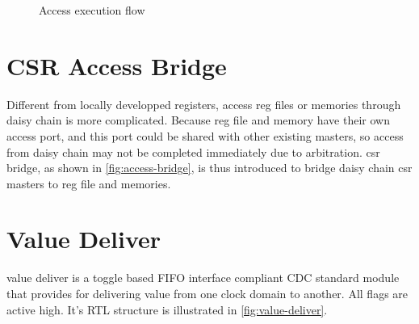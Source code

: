 \documentclass[10pt,oneside]{book}
\begin{document}
\SetAlFnt{\small}
\SetAlCapFnt{\small}
\SetAlCapNameFnt{\small}
\begin{figure}[hbtp]
  \begin{algorithm}[H]
    \caption{Access execution flow}\label{alg:access}
  \end{algorithm}
\end{figure}




\section{CSR Access Bridge}
Different from locally developped registers, access \gls{reg file}s or memories
through daisy chain is more complicated. Because \gls{reg file} and memory have
their own access port, and this port could be shared with other existing masters, 
so access from daisy chain may not be completed immediately due to arbitration. 
\gls{csr bridge}, as shown in \autoref{fig:access-bridge},
is thus introduced to bridge daisy chain \gls{csr master}s to \gls{reg file} 
and memories. 



\section{Value Deliver}
\gls{value deliver} is a toggle based FIFO interface compliant
CDC standard module that provides for delivering value from one
clock domain to another. All flags are active high. 
It's RTL structure is illustrated in \autoref{fig:value-deliver}.
\end{document}
